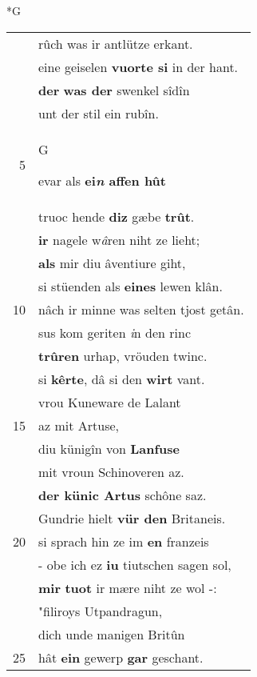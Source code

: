 \documentclass[8pt,a4paper,notitlepage]{article}
\begin{document}
\begin{table}[ht]
\begin{minipage}[t]{0.5\linewidth}
\end{minipage}
\end{table}
\newpage
\begin{table}[ht]
\begin{minipage}[t]{0.5\linewidth}
\small
\begin{center}*G
\end{center}
\begin{tabular}{rl}
 & rûch was ir antlütze erkant.\\ 
 & eine geiselen \textbf{vuorte si} in der hant.\\ 
 & \textbf{der} \textbf{was der} swenkel sîdîn\\ 
 & unt der stil ein rubîn.\\ 
5 & \begin{large}G\end{large}evar als \textbf{ei\textit{n} affen hût}\\ 
 & truoc hende \textbf{diz} gæbe \textbf{trût}.\\ 
 & \textbf{ir} nagele w\textit{â}ren niht ze lieht;\\ 
 & \textbf{als} mir diu âventiure giht,\\ 
 & si stüenden als \textbf{eines} lewen klân.\\ 
10 & nâch ir minne was selten tjost getân.\\ 
 & sus kom geriten \textit{i}n den rinc\\ 
 & \textbf{trûren} urhap, vröuden twinc.\\ 
 & si \textbf{kêrte}, dâ si den \textbf{wirt} vant.\\ 
 & vrou Kuneware de Lalant\\ 
15 & az mit Artuse,\\ 
 & diu künigîn von \textbf{Lanfuse}\\ 
 & mit vroun Schinoveren az.\\ 
 & \textbf{der künic Artus} schône saz.\\ 
 & Gundrie hielt \textbf{vür den} Britaneis.\\ 
20 & si sprach hin ze im \textbf{en} franzeis\\ 
 & - obe ich ez \textbf{iu} tiutschen sagen sol,\\ 
 & \textbf{mir} \textbf{tuot} ir mære niht ze wol -:\\ 
 & "filiroys Utpandragun,\\ 
 & dich unde manigen Britûn\\ 
25 & hât \textbf{ein} gewerp \textbf{gar} geschant.\\ 

\end{tabular}
\end{minipage}
\end{table}
\end{document}
